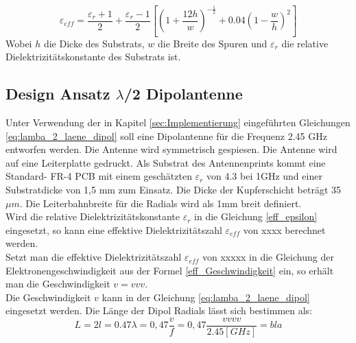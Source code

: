 \begin{equation}\label{eff_epsilon}
\varepsilon_{eff}=\dfrac{\varepsilon_r+1}{2}+\dfrac{\varepsilon_r-1}{2}\left[\left(1+\dfrac{12h}{w}\right)^{-\frac{1}{2}}+0.04\left(1-\dfrac{w}{h}\right)^{2}\right]
\end{equation}
Wobei $h$ die Dicke des Substrats, $w$ die Breite des Spuren und  $\varepsilon_{r}$ die relative Dielektrizitätskonstante des Substrats ist. 

\subsection{Design Ansatz $\lambda$/2 Dipolantenne}  
Unter Verwendung der in Kapitel \ref{sec:Implementierung} eingeführten Gleichungen \ref{eq:lamba_2_laene_dipol} soll eine Dipolantenne für die Frequenz 2.45 GHz entworfen werden. Die Antenne wird symmetrisch gespiesen. Die Antenne wird auf eine Leiterplatte gedruckt. Als Substrat des Antennenprints kommt eine Standard- FR-4 PCB mit einem geschätzten  $\varepsilon_r $ von 4.3 bei 1GHz und einer Substratdicke von 1,5 mm  zum Einsatz. Die Dicke der Kupferschicht beträgt 35 $\mu m$. Die Leiterbahnbreite für die Radials wird als 1mm breit definiert.\\

Wird die relative Dielektrizitätskonstante $\varepsilon_{r}$ in die Gleichung \ref{eff_epsilon} eingesetzt, so kann eine effektive Dielektrizitätszahl $\varepsilon_{eff}$  von xxxx berechnet werden.\\

Setzt man die effektive Dielektrizitätszahl $\varepsilon_{eff}$ von xxxxx  in die Gleichung der Elektronengeschwindigkeit aus der Formel \ref{eff_Geschwindigkeit} ein, so erhält man die Geschwindigkeit $v=vvv$. \\
Die Geschwindigkeit $v$  kann in der  Gleichung \ref{eq:lamba_2_laene_dipol} eingesetzt werden. Die Länge der Dipol Radials lässt sich bestimmen als:
\begin{equation}\label{eq:lamba_2_laene_dipol}
L=2l = 0.47 \lambda= 0,47 \dfrac{v}{f}=0,47 \dfrac{vvvv}{2.45[GHz]}=bla
\end{equation} 


